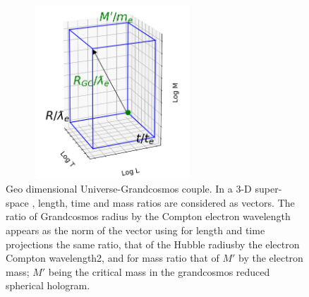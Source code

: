 \documentclass[twoside,draft]{article}
\begin{document}
\begin{sloppypar}
{\begin{figure}[h]
\centering
\includegraphics[width=8cm,height=6.5cm]{./figures/triaxis.png}
\caption{Geo dimensional Universe-Grandcosmos couple. In a 3-D super-space , length, time and mass ratios are considered as vectors. The ratio of Grandcosmos radius by the Compton electron wavelength appears as the norm of the vector using for length and time projections the same ratio, that of the Hubble radiusby the electron Compton wavelength2, and for mass ratio that of $M\prime$ by the electron mass; $M\prime$ being the critical mass in the grandcosmos reduced spherical hologram. }
\end{figure}

}
\end{sloppypar}
\end{document}
